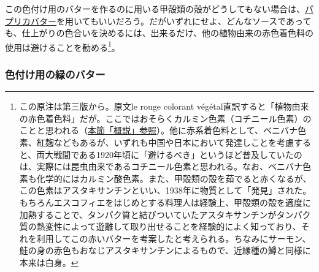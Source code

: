 \begin{recette}
この色付け用のバターを作るのに用いる甲殻類の殻がどうしてもない場合は、\protect\hyperlink{beurre-de-paprika}{パプリカバター}を用いてもいいだろう。だがいずれにせよ、どんなソースであっても、仕上がりの色合いを決めるには、出来るだけ、他の植物由来の赤色着色料の使用は避けることを勧める\footnote{この原注は第三版から。原文le
  rouge colorant
  végétal直訳すると「植物由来の赤色着色料」だが。ここではおそらくカルミン色素（コチニール色素）のことと思われる（\protect\hyperlink{observation-sur-les-beurres-composes}{本節「概説」参照}）。他に赤系着色料として、ベニバナ色素、紅麹などもあるが、いずれも中国や日本において発達しことを考慮すると、両大戦間である1920年頃に「避けるべき」というほど普及していたのは、実際には昆虫由来であるコチニール色素と思われる。なお、ベニバナ色素も化学的にはカルミン酸色素。また、甲殻類の殻を茹でると赤くなるが、この色素はアスタキサンチンといい、1938年に物質として「発見」された。もちろんエスコフィエをはじめとする料理人は経験上、甲殻類の殻を適度に加熱することで、タンパク質と結びついていたアスタキサンチンがタンパク質の熱変性によって遊離して取り出せることを経験的によく知っており、それを利用してこの赤いバターを考案したと考えられる。ちなみにサーモン、鮭の身の赤色もおなじアスタキサンチンによるもので、近縁種の鱒と同様に本来は白身。}。

\hypertarget{beurre-colorant-vert}{%
\subsubsection{色付け用の緑のバター}\label{beurre-colorant-vert}}




\end{recette}

